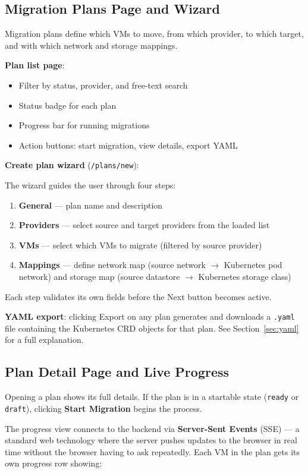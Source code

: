 \documentclass[12pt,a4paper]{article}
\begin{document}
\subsection{Migration Plans Page and Wizard}

Migration plans define which VMs to move, from which provider, to which target, and with which network and storage mappings.

\textbf{Plan list page}:
\begin{itemize}
  \item Filter by status, provider, and free-text search
  \item Status badge for each plan
  \item Progress bar for running migrations
  \item Action buttons: start migration, view details, export YAML
\end{itemize}

\textbf{Create plan wizard} (\texttt{/plans/new}):

The wizard guides the user through four steps:
\begin{enumerate}
  \item \textbf{General} — plan name and description
  \item \textbf{Providers} — select source and target providers from the loaded list
  \item \textbf{VMs} — select which VMs to migrate (filtered by source provider)
  \item \textbf{Mappings} — define network map (source network $\to$ Kubernetes pod network) and storage map (source datastore $\to$ Kubernetes storage class)
\end{enumerate}

Each step validates its own fields before the Next button becomes active.

\textbf{YAML export}: clicking Export on any plan generates and downloads a \texttt{.yaml} file containing the Kubernetes CRD objects for that plan. See Section~\ref{sec:yaml} for a full explanation.

\subsection{Plan Detail Page and Live Progress}

Opening a plan shows its full details. If the plan is in a startable state (\texttt{ready} or \texttt{draft}), clicking \textbf{Start Migration} begins the process.

The progress view connects to the backend via \textbf{Server-Sent Events} (SSE) — a standard web technology where the server pushes updates to the browser in real time without the browser having to ask repeatedly. Each VM in the plan gets its own progress row showing:
\end{document}
